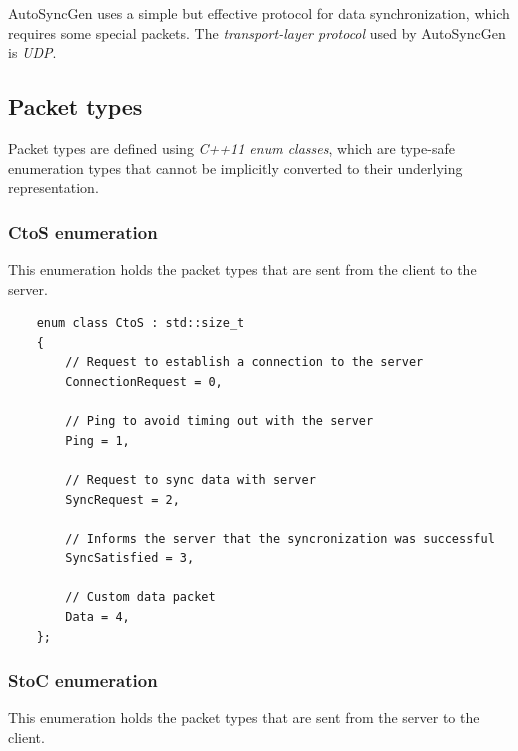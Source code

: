 \documentclass{report}
\begin{document}
            AutoSyncGen uses a simple but effective protocol for data synchronization, which requires some special packets.
            The \emph{transport-layer protocol} used by AutoSyncGen is \emph{UDP}.

            \subsection{Packet types}
                Packet types are defined using \emph{C++11 enum classes}, which are type-safe enumeration types that cannot be implicitly converted to their underlying representation.

                \subsubsection{CtoS enumeration}
                    This enumeration holds the packet types that are sent from the client to the server.

                    \begin{verbatim}
    enum class CtoS : std::size_t
    {
        // Request to establish a connection to the server
        ConnectionRequest = 0,      
        
        // Ping to avoid timing out with the server
        Ping = 1,                   

        // Request to sync data with server
        SyncRequest = 2,            
        
        // Informs the server that the syncronization was successful
        SyncSatisfied = 3,         

        // Custom data packet
        Data = 4,                   
    };
                    \end{verbatim}

                \subsubsection{StoC enumeration}
                    This enumeration holds the packet types that are sent from the server to the client.
\end{document}
